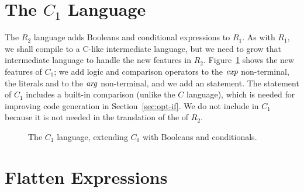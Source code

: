 \documentclass[11pt]{book}
\newcommand{\gray}[1]{{\color{lightgray} #1}}
\begin{document}
\section{The $C_1$ Language}
\label{sec:c1}

The $R_2$ language adds Booleans and conditional expressions to $R_1$.
As with $R_1$, we shall compile to a C-like intermediate language, but
we need to grow that intermediate language to handle the new features
in $R_2$. Figure~\ref{fig:c1-syntax} shows the new features of $C_1$;
we add logic and comparison operators to the $\mathit{exp}$ non-terminal, the
literals  and  to the $\mathit{arg}$ non-terminal, and we
add an  statement. The  statement of $C_1$ includes a
built-in comparison (unlike the $C$ language), which is needed for
improving code generation in Section~\ref{sec:opt-if}.  We do not
include  in $C_1$ because it is not needed in the translation
of the  of $R_2$.

\begin{figure}[tp]
\fbox{
\begin{minipage}{0.96\textwidth}
\[
\begin{array}{lcl}
\Arg &::=& \gray{\Int \mid \Var} \mid \key{\#t} \mid \key{\#f} \\
\itm{cmp} &::= & \key{eq?} \mid \key{<} \mid \key{<=} \mid \key{>} \mid \key{>=} \\
\Exp &::= & \gray{\Arg \mid (\key{read}) \mid (\key{-}\;\Arg) \mid (\key{+} \; \Arg\;\Arg)}
      \mid (\key{not}\;\Arg) \mid (\itm{cmp}\;\Arg\;\Arg) \\
\Stmt &::=& \gray{\ASSIGN{\Var}{\Exp} \mid \RETURN{\Arg}} \\
      &\mid& \IF{(\itm{cmp}\, \Arg\,\Arg)}{\Stmt^{*}}{\Stmt^{*}} \\
C_1 & ::= & (\key{program}\;(\Var^{*})\;(\key{type}\;\textit{type})\;\Stmt^{+})
\end{array}
\]
\end{minipage}
}
\caption{The $C_1$ language, extending $C_0$ with Booleans and conditionals.}
\label{fig:c1-syntax}
\end{figure}

\section{Flatten Expressions}
\label{sec:flatten-r2}
\end{document}
